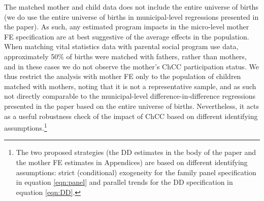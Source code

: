 \documentclass[12pt]{article}
\begin{document}
\begin{spacing}{1.4}
The matched mother and child data does not include the entire
universe of births (we do use the entire universe of births in
municipal-level regressions presented in the paper).  As such,
any estimated program impacts in the micro-level mother FE
specification are at best suggestive of the average effects in
the population.  When matching vital statistics data with
parental social program use data, approximately 50\% of births
were matched with fathers, rather than mothers, and in these
cases we do not observe the mother's ChCC participation status.
We thus restrict the analysis with mother FE only to the
population of children matched with mothers, noting that it is
not a representative sample, and as such not directly comparable
to the municipal-level difference-in-difference regressions
presented in the paper based on the entire universe of births.
Nevertheless, it acts as a useful robustness check of the impact
of ChCC based on different identifying assumptions.\footnote{The
  two proposed strategies (the DD estimates in the body of the
  paper and the mother FE estimates in Appendices) are based on
  different identifying assumptions: strict (conditional)
  exogeneity for the family panel specification in equation
  \ref{eqn:panel} and parallel trends for the DD specification
  in equation \ref{eqn:DD}.}
%


\end{spacing}
\end{document}
